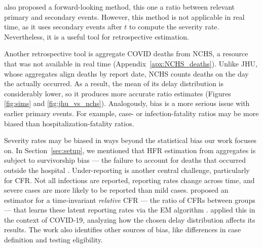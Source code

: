 \documentclass{article}
\begin{document}
\citet{UKpaper} also proposed a forward-looking method, this one a ratio between relevant primary and secondary events. However, this method is not applicable in real time, as it uses secondary events after $t$ to compute the severity rate. Nevertheless, it is a useful tool for retrospective estimation. 

Another retrospective tool is aggregate COVID deaths from NCHS, a resource that
was not available in real time (Appendix~\ref{apx:NCHS_deaths}). Unlike JHU,
whose aggregates align deaths by report date, NCHS counts deaths on the day the
actually occurred. As a result, the mean of its delay distribution is
considerably lower, so it produces more accurate ratio estimates (Figures
\ref{fig:sims} and \ref{fig:jhu_vs_nchs}). Analogously, bias is a more serious
issue with earlier primary events. For example, case- or infection-fatality
ratios may be more biased than hospitalization-fatality ratios. 

Severity rates may be biased in ways beyond the statistical bias our work
focuses on. 
In Section~\ref{sec:setup}, we mentioned that 
HFR estimation from aggregates is subject to survivorship bias --- 
the failure to account for deaths that occurred outside the hospital \citep{lipsitch2015potential}.
Under-reporting is another central challenge, particularly for CFR.
Not all infections are reported, reporting rates change across time, and severe
cases are more likely to be reported than mild cases.
\citet{reich2012estimating} proposed an estimator for a time-invariant
\textit{relative} CFR --- the ratio of CFRs between groups --- that learns these
latent reporting rates via the EM algorithm \citep{EM}. \citet{anastasios}
applied this in the context of COVID-19, analyzing how the chosen delay
distribution affects its results. The work also identifies other sources of bias, like
differences in case definition and testing eligibility.
\end{document}
